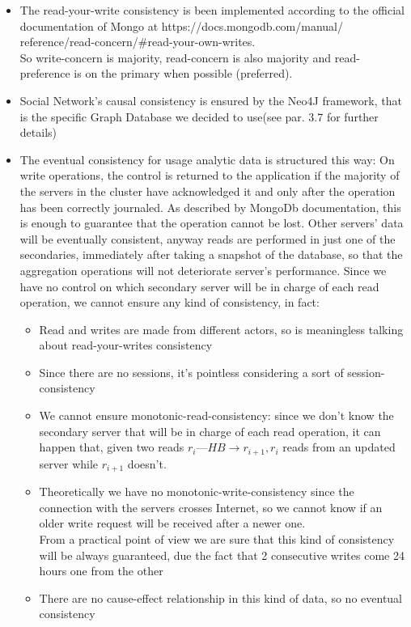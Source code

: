\begin{itemize}
	\item The read-your-write consistency is been implemented according to the official documentation of Mongo at https://docs.mongodb.com/manual/ reference/read-concern/\#read-your-own-writes. \\
	So write-concern is majority, read-concern is also majority and read-preference is on the primary when possible (preferred). 
 	\item Social Network’s causal consistency is ensured by the Neo4J framework, that is the specific Graph Database we decided to use(see par. 3.7 for further details)
	\item The eventual consistency for usage analytic data is structured this way: On write operations, the control is returned to the application if the majority of the servers in the cluster have acknowledged it and only after the operation has been correctly journaled. As described by MongoDb documentation, this is enough to guarantee that the operation cannot be lost. Other servers’ data will be eventually consistent, anyway reads are performed in just one of the secondaries, immediately after taking a snapshot of the database, so that the aggregation operations will not deteriorate server’s performance. Since we have no control on which secondary server will be in charge of each read operation, we cannot ensure any kind of consistency, in fact:

	\begin{itemize}
		\item Read and writes are made from different actors, so is meaningless talking about read-your-writes consistency
		\item Since there are no sessions, it’s pointless considering a sort of session-consistency
		\item We cannot ensure monotonic-read-consistency: since we don’t know the secondary server that will be in charge of each read operation, it can happen that, given two reads $r_{i}—HB \rightarrow r_{i+1}, r_{i}$ reads from an updated server while $r_{i+1}$ doesn’t.
		\item Theoretically we have no monotonic-write-consistency since the connection with the servers crosses Internet, so we cannot know if an older write request will be received after a newer one. \\
		From a practical point of view we are sure that this kind of consistency will be always guaranteed, due the fact that 2 consecutive writes come 24 hours one from the other
		\item There are no cause-effect relationship in this kind of data, so no eventual consistency		
	\end{itemize}
\end{itemize}

